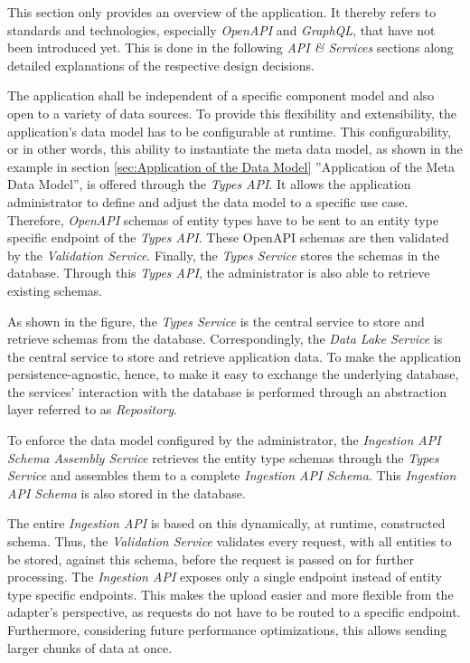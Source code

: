 This section only provides an overview of the application. It thereby refers to standards and technologies, especially \emph{OpenAPI} and \emph{GraphQL}, that have not been introduced yet. This is done in the following \emph{API \& Services} sections along detailed explanations of the respective design decisions.\par
The application shall be independent of a specific component model and also open to a variety of data sources. To provide this flexibility and extensibility, the application's data model has to be configurable at runtime. This configurability, or in other words, this ability to instantiate the meta data model, as shown in the example in section \ref{sec:Application of the Data Model} ''Application of the Meta Data Model'', is offered through the \emph{Types API}. It allows the application administrator to define and adjust the data model to a specific use case. Therefore, \emph{OpenAPI} schemas of entity types have to be sent to an entity type specific endpoint of the \emph{Types API}. These OpenAPI schemas are then validated by the \emph{Validation Service}. Finally, the \emph{Types Service} stores the schemas in the database. Through this \emph{Types API}, the administrator is also able to retrieve existing schemas.\par
As shown in the figure, the \emph{Types Service} is the central service to store and retrieve schemas from the database. Correspondingly, the \emph{Data Lake Service} is the central service to store and retrieve application data. To make the application persistence-agnostic, hence, to make it easy to exchange the underlying database, the services' interaction with the database is performed through an abstraction layer referred to as \emph{Repository}.\par 
To enforce the data model configured by the administrator, the \emph{Ingestion API Schema Assembly Service} retrieves the entity type schemas through the \emph{Types Service} and assembles them to a complete \emph{Ingestion API Schema}. This \emph{Ingestion API Schema} is also stored in the database.\par
The entire \emph{Ingestion API} is based on this dynamically, at runtime, constructed schema. Thus, the \emph{Validation Service} validates every request, with all entities to be stored, against this schema, before the request is passed on for further processing. The \emph{Ingestion API} exposes only a single endpoint instead of entity type specific endpoints. This makes the upload easier and more flexible from the adapter's perspective, as requests do not have to be routed to a specific endpoint. Furthermore, considering future performance optimizations, this allows sending larger chunks of data at once.\par
